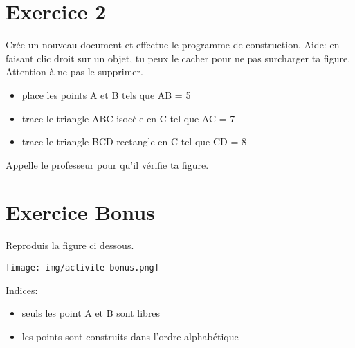 \documentclass[12pt,a4paper]{article}
\begin{document}
\section*{Exercice 2}
Crée un nouveau document et effectue le programme de construction.
Aide: en faisant clic droit sur un objet, tu peux le cacher pour ne pas surcharger ta figure. Attention à ne pas le supprimer.
\begin{itemize}
\item place les points A et B tels que AB = 5
\item trace le triangle ABC isocèle en C tel que AC = 7
\item trace le triangle BCD rectangle en C tel que CD = 8
\end{itemize}
Appelle le professeur pour qu'il vérifie ta figure.

\newpage

\section*{Exercice Bonus}
Reproduis la figure ci dessous.

\texttt{[image: img/activite-bonus.png]} 

Indices: 
\begin{itemize}
\item seuls les point A et B sont libres
\item les points sont construits dans l'ordre alphabétique
\end{itemize}
\end{document}
